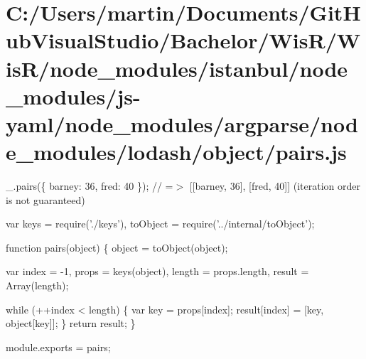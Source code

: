 \hypertarget{_c_1_2_users_2martin_2_documents_2_git_hub_visual_studio_2_bachelor_2_wis_r_2_wis_r_2node_modulecdf17760245cbc19d42eb774e42ecedc}{}\section{C\+:/\+Users/martin/\+Documents/\+Git\+Hub\+Visual\+Studio/\+Bachelor/\+Wis\+R/\+Wis\+R/node\+\_\+modules/istanbul/node\+\_\+modules/js-\/yaml/node\+\_\+modules/argparse/node\+\_\+modules/lodash/object/pairs.\+js}
\+\_\+.\+pairs(\{ \textquotesingle{}barney\textquotesingle{}\+: 36, \textquotesingle{}fred\textquotesingle{}\+: 40 \}); // =$>$ \mbox{[}\mbox{[}\textquotesingle{}barney\textquotesingle{}, 36\mbox{]}, \mbox{[}\textquotesingle{}fred\textquotesingle{}, 40\mbox{]}\mbox{]} (iteration order is not guaranteed)


\begin{DoxyCodeInclude}
var keys = require(\textcolor{stringliteral}{'./keys'}),
    toObject = require(\textcolor{stringliteral}{'../internal/toObject'});

\textcolor{keyword}{function} pairs(\textcolor{keywordtype}{object}) \{
  \textcolor{keywordtype}{object} = toObject(\textcolor{keywordtype}{object});

  var index = -1,
      props = keys(\textcolor{keywordtype}{object}),
      length = props.length,
      result = Array(length);

  \textcolor{keywordflow}{while} (++index < length) \{
    var key = props[index];
    result[index] = [key, \textcolor{keywordtype}{object}[key]];
  \}
  \textcolor{keywordflow}{return} result;
\}

module.exports = pairs;
\end{DoxyCodeInclude}
 
